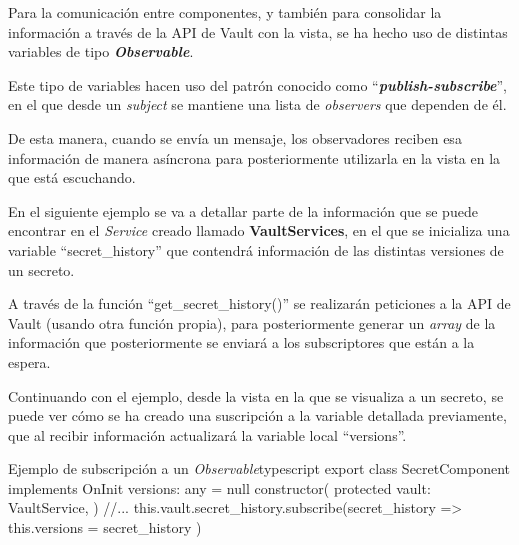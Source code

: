 \documentclass{\ClassPath/viu-tfm-template}
\begin{document}
Para la comunicación entre componentes, y también para consolidar la información a través de la API de Vault con la vista, se ha hecho uso de distintas variables de tipo \textbf{\textit{Observable}}.

Este tipo de variables hacen uso del patrón conocido como “\textit{\textbf{publish-subscribe}}”, en el que desde un \textit{subject} se mantiene una lista de \textit{observers} que dependen de él.

De esta manera, cuando se envía un mensaje, los observadores reciben esa información de manera asíncrona para posteriormente utilizarla en la vista en la que está escuchando.

En el siguiente ejemplo se va a detallar parte de la información que se puede encontrar en el \textit{Service} creado llamado \textbf{VaultServices}, en el que se inicializa una variable “secret\_history” que contendrá información de las distintas versiones de un secreto.

A través de la función “get\_secret\_history()” se realizarán peticiones a la API de Vault (usando otra función propia), para posteriormente generar un \textit{array} de la información que posteriormente se enviará a los subscriptores que están a la espera.


Continuando con el ejemplo, desde la vista en la que se visualiza a un secreto, se puede ver cómo se ha creado una suscripción a la variable detallada previamente, que al recibir información actualizará la variable local “versions”.

\begin{mycode}{Ejemplo de subscripción a un \textit{Observable}}{typescript}{}
export class SecretComponent implements OnInit {
    versions: any = null
    constructor(
        protected vault: VaultService,
    ) {
        //...
        this.vault.secret_history.subscribe(secret_history => {
            this.versions = secret_history
        })
    }
}
\end{mycode}
\end{document}
